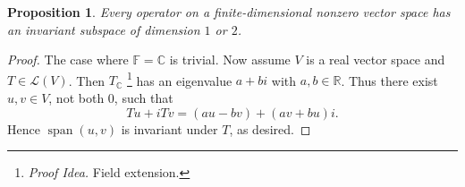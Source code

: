 \documentclass[nofonts,colorlinks]{tufte-handout}
\theoremstyle{plain} %
\newtheorem{prop}[thm]{Proposition}
\theoremstyle{definition}
\theoremstyle{remark}
\def\idea{\textit{\color[rgb]{0,0,.55}Proof Idea. }}
\newcommand{\R}{\mathbb{R}}
\newcommand{\C}{\mathbb{C}}
\newcommand{\F}{\mathbb{F}}
\renewcommand{\L}{\mathcal{L}}
\DeclareMathOperator{\spn}{span}
\begin{document}
\begin{prop}
	Every operator on a finite-dimensional nonzero vector space has an invariant subspace of dimension $1$ or $2$.
\end{prop}
\begin{proof}
	The case where $\F=\C$ is trivial. Now assume $V$ is a real vector space and $T\in\L(V)$. Then $T_\C$%
	\footnote{\idea Field extension.}
	has an eigenvalue $a+bi$ with $a,b\in\R$. Thus there exist $u,v\in V$, not both $0$, such that
	\[Tu+iTv=(au-bv)+(av+bu)i.\]
	Hence $\spn(u,v)$ is invariant under $T$, as desired.
\end{proof}
\end{document}
